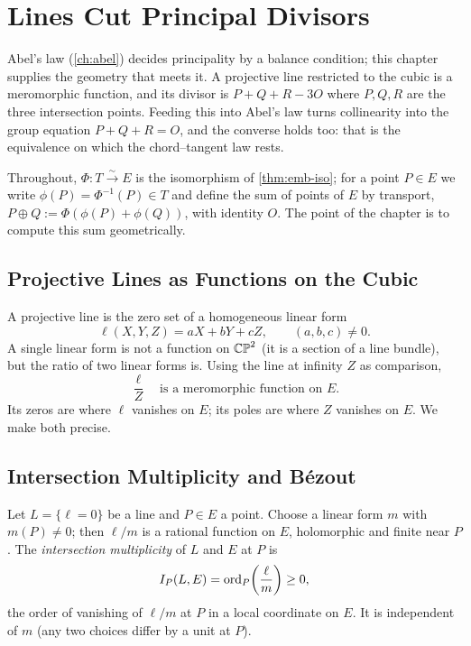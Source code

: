\chapter{Lines Cut Principal Divisors}
\label{ch:lines_divisors}

Abel's law (\cref{ch:abel}) decides principality by a balance condition; this
chapter supplies the geometry that meets it. A projective line restricted to the
cubic is a meromorphic function, and its divisor is \(P + Q + R - 3O\) where
\(P, Q, R\) are the three intersection points. Feeding this into Abel's law turns
collinearity into the group equation \(P + Q + R = O\), and the converse holds
too: that is the equivalence on which the chord--tangent law rests.

Throughout, \(\Phi : T \xrightarrow{\sim} E\) is the isomorphism of
\cref{thm:emb-iso}; for a point \(P \in E\) we write \(\phi(P) = \Phi^{-1}(P) \in T\)
and define the sum of points of \(E\) by transport, \(P \oplus Q :=
\Phi(\phi(P) + \phi(Q))\), with identity \(O\). The point of the chapter is to
compute this sum geometrically.

\section{Projective Lines as Functions on the Cubic}
\label{sec:lin-lines}

A projective line is the zero set of a homogeneous linear form
\[
  \ell(X, Y, Z) = aX + bY + cZ, \qquad (a,b,c) \ne 0 .
\]
A single linear form is not a function on \(\mathbb{CP}^2\) (it is a section of a line
bundle), but the ratio of two linear forms is. Using the line at infinity \(Z\)
as comparison,
\[
  \frac{\ell}{Z} \quad\text{is a meromorphic function on } E .
\]
Its zeros are where \(\ell\) vanishes on \(E\); its poles are where \(Z\) vanishes
on \(E\). We make both precise.

\section{Intersection Multiplicity and B\'ezout}
\label{sec:lin-bezout}

\begin{definition}
\label{def:lin-mult}
Let \(L = \{\ell = 0\}\) be a line and \(P \in E\) a point. Choose a linear form
\(m\) with \(m(P) \ne 0\); then \(\ell/m\) is a rational function on \(E\),
holomorphic and finite near \(P\). The \emph{intersection multiplicity} of \(L\)
and \(E\) at \(P\) is
\[
  I_P(L, E) = \operatorname{ord}_P\!\left( \frac{\ell}{m} \right) \ge 0,
\]
the order of vanishing of \(\ell/m\) at \(P\) in a local coordinate on \(E\). It is
independent of \(m\) (any two choices differ by a unit at \(P\)).
\end{definition}

